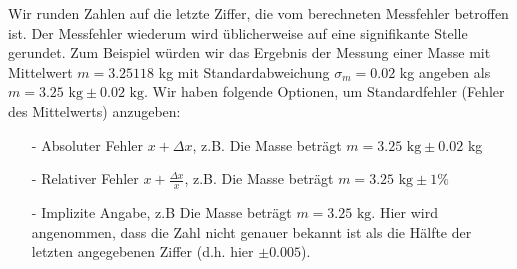 Wir runden Zahlen auf die letzte Ziffer, die vom berechneten Messfehler betroffen ist. Der Messfehler wiederum wird üblicherweise auf eine signifikante Stelle gerundet. Zum Beispiel würden wir das Ergebnis der Messung einer Masse mit Mittelwert $m = 3.25118$ kg mit Standardabweichung $\sigma_m =0.02$ kg angeben als $m=3.25\text{ kg}\pm 0.02  
 \text{ kg}$. Wir haben folgende Optionen, um Standardfehler (Fehler des Mittelwerts) anzugeben:
 \begin{enumerate}
     \item[-] Absoluter Fehler $x + \Delta x$, z.B. Die Masse beträgt $m=3.25\text{ kg}\pm 0.02$ kg  
     \item[-] Relativer Fehler  $x + \frac{\Delta x}{x}$, z.B. Die Masse beträgt $m=3.25\text{ kg}\pm 1\%$ 
     \item[-] Implizite Angabe, z.B Die Masse beträgt $m=3.25\text{ kg}$. Hier wird angenommen, dass die Zahl nicht genauer bekannt ist als die Hälfte der letzten angegebenen Ziffer (d.h. hier $\pm 0.005$).
 \end{enumerate}


\newpage


